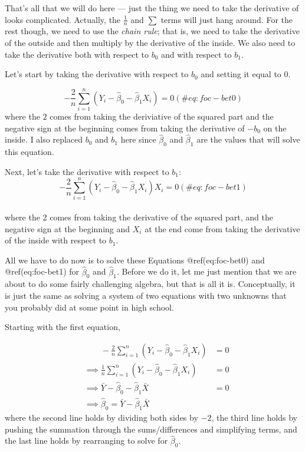 \documentclass[
  letterpaper,
  DIV=11,
  numbers=noendperiod]{scrreprt}
\begin{document}
That's all that we will do here --- just the thing we need to take the
derivative of looks complicated. Actually, the \(\frac{1}{n}\) and
\(\sum\) terms will just hang around. For the rest though, we need to
use the \emph{chain rule}; that is, we need to take the derivative of
the outside and then multiply by the derivative of the inside. We also
need to take the derivative both with respect to \(b_0\) and with
respect to \(b_1\).

Let's start by taking the derivative with respect to \(b_0\) and setting
it equal to 0.

\[
  -\frac{2}{n}\sum_{i=1}^n (Y_i - \hat{\beta}_0 - \hat{\beta}_1 X_i) = 0 (\#eq:foc-bet0)
\] where the \(2\) comes from taking the deriviative of the squared part
and the negative sign at the beginning comes from taking the derivative
of \(-b_0\) on the inside. I also replaced \(b_0\) and \(b_1\) here
since \(\hat{\beta}_0\) and \(\hat{\beta}_1\) are the values that will
solve this equation.

Next, let's take the derivative with respect to \(b_1\): \[
  -\frac{2}{n} \sum_{i=1}^n (Y_i - \hat{\beta}_0 - \hat{\beta}_1 X_i) X_i = 0 (\#eq:foc-bet1)
\]\\
where the 2 comes from taking the derivative of the squared part, and
the negative sign at the beginning and \(X_i\) at the end come from
taking the derivative of the inside with respect to \(b_1\).

All we have to do now is to solve these Equations @ref(eq:foc-bet0) and
@ref(eq:foc-bet1) for \(\hat{\beta}_0\) and \(\hat{\beta}_1\). Before we
do it, let me just mention that we are about to do some fairly
challenging algebra, but that is all it is. Conceptually, it is just the
same as solving a system of two equations with two unknowns that you
probably did at some point in high school.

Starting with the first equation,

\[
  \begin{aligned}
  & \phantom{\implies} -\frac{2}{n} \sum_{i=1}^n (Y_i - \hat{\beta}_0 - \hat{\beta}_1 X_i) &= 0 \\
  & \implies \frac{1}{n} \sum_{i=1}^n (Y_i - \hat{\beta}_0 - \hat{\beta}_1 X_i) &= 0 \\
  & \implies \bar{Y} - \hat{\beta}_0 - \hat{\beta}_1 \bar{X} &= 0 \\
  & \implies \boxed{\hat{\beta}_0 = \bar{Y} - \hat{\beta}_1 \bar{X}} 
  \end{aligned} 
\] where the second line holds by dividing both sides by \(-2\), the
third line holds by pushing the summation through the sums/differences
and simplifying terms, and the last line holds by rearranging to solve
for \(\hat{\beta}_0\).
\end{document}
